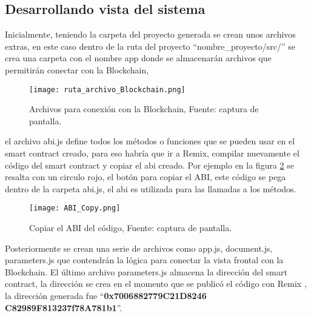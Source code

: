 \subsection{Desarrollando vista del sistema}
Inicialmente, teniendo la carpeta del proyecto generada se crean unos archivos extras, en este caso dentro de la ruta del proyecto “nombre\_proyecto/src/” se crea una carpeta con el nombre \/app donde
se almacenarán archivos que permitirán conectar con la Blockchain,

\begin{figure}[H]
  \centering
  {\texttt{[image: ruta\_archivo\_Blockchain.png]}}
  \caption{Archivos para conexión con la Blockchain, Fuente: captura de pantalla. }
  \label{img:ruta_archivo_Blockchain}
\end{figure}
el archivo abi.js define todos los métodos o funciones que se pueden usar en el smart contract creado, para eso 
habría que ir a Remix, compilar nuevamente el código del smart contract y copiar el \gls{abi} creado. Por ejemplo 
en la figura \ref{img:abi_copy} se resalta con un circulo rojo, el botón para copiar el ABI, este código se pega 
dentro de la carpeta abi.js, el \gls{abi} es utilizada para  las llamadas a los métodos.

\begin{figure}[H]
  \centering
  {\texttt{[image: ABI\_Copy.png]}}
  \caption{Copiar el ABI del código, Fuente: captura de pantalla. }
  \label{img:abi_copy}
\end{figure}

Posteriormente se crean una serie de archivos como app.js, document.js, parameters.js que contendrán la lógica para conectar la vista frontal con la Blockchain.
El último archivo parameters.js almacena la dirección del smart contract, la dirección se crea en el momento que se publicó el código con Remix ,
la dirección generada fue “\textbf{0x7006882779C21D8246 C82989F813237f78A781b1}”.


